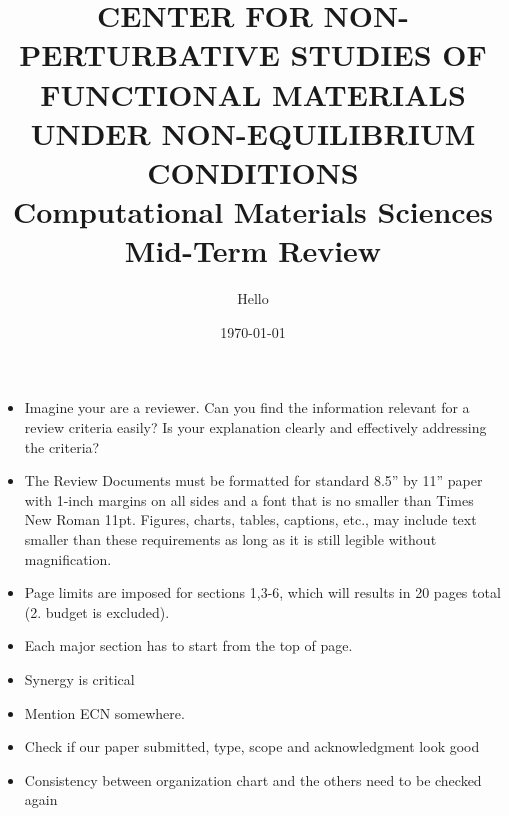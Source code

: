 \documentclass[11pt]{article}
\begin{document}
\title{CENTER FOR NON-PERTURBATIVE STUDIES OF FUNCTIONAL MATERIALS UNDER NON-EQUILIBRIUM CONDITIONS\\Computational Materials Sciences Mid-Term Review} %

\date{\today} %
\author{Hello}

\maketitle %
{\bf\color{red}
\begin{itemize}
    \item Imagine your are a reviewer. Can you find the information relevant for a review criteria easily? Is your explanation clearly and effectively addressing the criteria?
    \item The Review Documents must be formatted for standard 8.5” by 11” paper with 1-inch margins on all sides and a font that is no smaller than Times New Roman 11pt. Figures, charts, tables, captions, etc., may include text smaller than these requirements as long as it is still legible without magnification.
    \item Page limits are imposed for sections 1,3-6, which will results in 20 pages total (2. budget is excluded).
    \item Each major section has to start from the top of page.
    \item Synergy is critical
    \item Mention ECN somewhere.
    \item Check if our paper submitted, type, scope and acknowledgment look good
    \item Consistency between organization chart and the others need to be checked again
\end{itemize}
}

\clearpage
\setcounter{tocdepth}{2}
\tableofcontents
\end{document}
